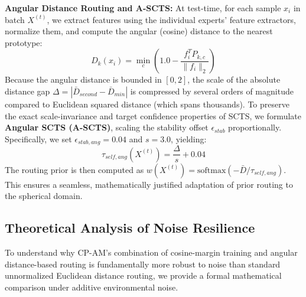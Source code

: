 \documentclass{article}
\theoremstyle{plain}
\theoremstyle{definition}
\theoremstyle{remark}
\begin{document}
\textbf{Angular Distance Routing and A-SCTS:} At test-time, for each sample $x_i$ in batch $X^{(t)}$, we extract features using the individual experts' feature extractors, normalize them, and compute the angular (cosine) distance to the nearest prototype:
\begin{equation}
D_k(x_i) = \min_{c} \left( 1.0 - \frac{f_i^T P_{k,c}}{\|f_i\|_2} \right)
\end{equation}
Because the angular distance is bounded in $[0, 2]$, the scale of the absolute distance gap $\Delta = |\bar{D}_{second} - \bar{D}_{min}|$ is compressed by several orders of magnitude compared to Euclidean squared distance (which spans thousands). To preserve the exact scale-invariance and target confidence properties of SCTS, we formulate \textbf{Angular SCTS (A-SCTS)}, scaling the stability offset $\epsilon_{stab}$ proportionally. Specifically, we set $\epsilon_{stab,ang} = 0.04$ and $s = 3.0$, yielding:
\begin{equation}
\tau_{self,ang}(X^{(t)}) = \frac{\Delta}{s} + 0.04
\end{equation}
The routing prior is then computed as $w(X^{(t)}) = \text{softmax}(-\bar{D} / \tau_{self,ang})$. This ensures a seamless, mathematically justified adaptation of prior routing to the spherical domain.

\subsection{Theoretical Analysis of Noise Resilience}
To understand why CP-AM's combination of cosine-margin training and angular distance-based routing is fundamentally more robust to noise than standard unnormalized Euclidean distance routing, we provide a formal mathematical comparison under additive environmental noise.
\end{document}
